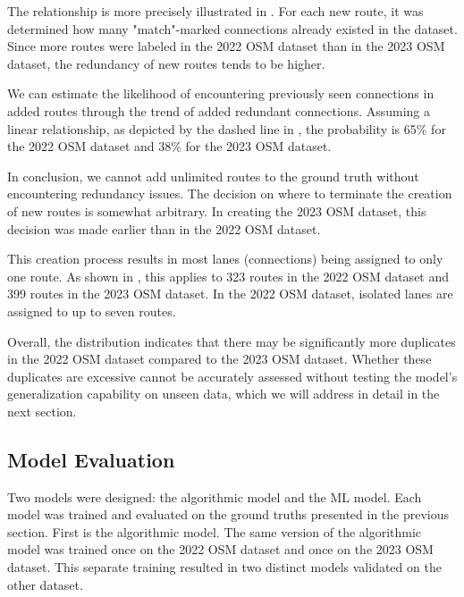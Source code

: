 The relationship is more precisely illustrated in . For each new route, it was determined how many "match"-marked connections already existed in the dataset. Since more routes were labeled in the 2022 OSM dataset than in the 2023 OSM dataset, the redundancy of new routes tends to be higher.

We can estimate the likelihood of encountering previously seen connections in added routes through the trend of added redundant connections. Assuming a linear relationship, as depicted by the dashed line in , the probability is 65\% for the 2022 OSM dataset and 38\% for the 2023 OSM dataset.

In conclusion, we cannot add unlimited routes to the ground truth without encountering redundancy issues. The decision on where to terminate the creation of new routes is somewhat arbitrary. In creating the 2023 OSM dataset, this decision was made earlier than in the 2022 OSM dataset.

This creation process results in most lanes (connections) being assigned to only one route. As shown in , this applies to 323 routes in the 2022 OSM dataset and 399 routes in the 2023 OSM dataset. In the 2022 OSM dataset, isolated lanes are assigned to up to seven routes.

Overall, the distribution indicates that there may be significantly more duplicates in the 2022 OSM dataset compared to the 2023 OSM dataset. Whether these duplicates are excessive cannot be accurately assessed without testing the model's generalization capability on unseen data, which we will address in detail in the next section.

\subsection{Model Evaluation}\label{sec:jeschor2}

Two models were designed: the algorithmic model and the ML model. Each model was trained and evaluated on the ground truths presented in the previous section. First is the algorithmic model. The same version of the algorithmic model was trained once on the 2022 OSM dataset and once on the 2023 OSM dataset. This separate training resulted in two distinct models validated on the other dataset.

